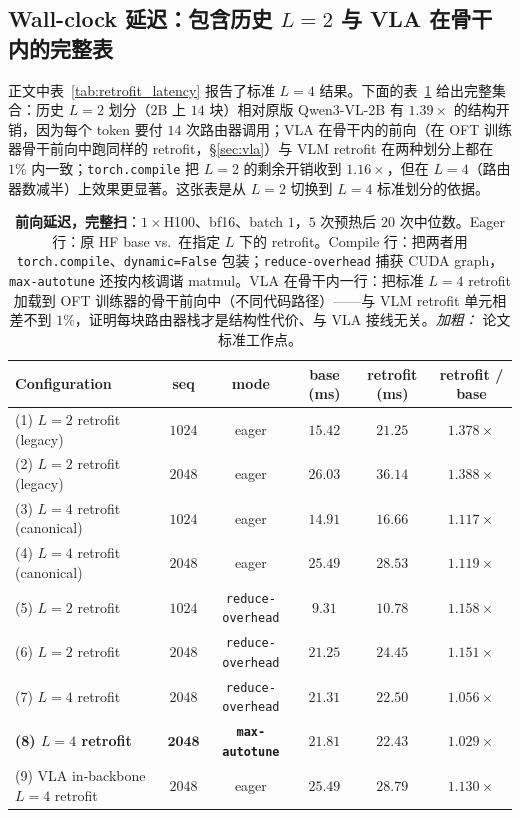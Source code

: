 \documentclass{article}
\begin{document}
\subsection{\texorpdfstring{Wall-clock 延迟：包含历史 $L{=}2$ 与 VLA 在骨干内的完整表}{Wall-clock latency: full table including legacy L=2 and VLA in-backbone}}
\label{app:latency}
正文中表~\ref{tab:retrofit_latency} 报告了标准 $L{=}4$ 结果。下面的表~\ref{tab:retrofit_latency_full} 给出完整集合：历史 $L{=}2$ 划分（$2$B 上 $14$ 块）相对原版 Qwen3-VL-2B 有 $1.39\times$ 的结构开销，因为每个 token 要付 $14$ 次路由器调用；VLA 在骨干内的前向（在 OFT 训练器骨干前向中跑同样的 retrofit，\S\ref{sec:vla}）与 VLM retrofit 在两种划分上都在 $1\%$ 内一致；\texttt{torch.compile} 把 $L{=}2$ 的剩余开销收到 $1.16\times$，但在 $L{=}4$（路由器数减半）上效果更显著。这张表是从 $L{=}2$ 切换到 $L{=}4$ 标准划分的依据。

\begin{table}[h]
\caption{\textbf{前向延迟，完整扫}：$1{\times}$H100、bf16、batch $1$，$5$ 次预热后 $20$ 次中位数。Eager 行：原 HF base vs.\ 在指定 $L$ 下的 retrofit。Compile 行：把两者用 \texttt{torch.compile}、\texttt{dynamic=False} 包装；\texttt{reduce-overhead} 捕获 CUDA graph，\texttt{max-autotune} 还按内核调谐 matmul。VLA 在骨干内一行：把标准 $L{=}4$ retrofit 加载到 OFT 训练器的骨干前向中（不同代码路径）——与 VLM retrofit 单元相差不到 $1\%$，证明每块路由器栈才是结构性代价、与 VLA 接线无关。\emph{加粗：} 论文标准工作点。}
\label{tab:retrofit_latency_full}
\centering\small
\setlength{\tabcolsep}{4pt}
\begin{tabular}{lccccc}
\toprule
Configuration & seq & mode & base (ms) & retrofit (ms) & retrofit / base \\
\midrule
(1) $L{=}2$ retrofit (legacy)        & $1024$ & eager & $15.42$ & $21.25$ & $1.378\times$ \\
(2) $L{=}2$ retrofit (legacy)        & $2048$ & eager & $26.03$ & $36.14$ & $1.388\times$ \\
(3) $L{=}4$ retrofit (canonical)     & $1024$ & eager & $14.91$ & $16.66$ & $1.117\times$ \\
(4) $L{=}4$ retrofit (canonical)     & $2048$ & eager & $25.49$ & $28.53$ & $1.119\times$ \\
\midrule
(5) $L{=}2$ retrofit                 & $1024$ & \texttt{reduce-overhead}  & $9.31$  & $10.78$ & $1.158\times$ \\
(6) $L{=}2$ retrofit                 & $2048$ & \texttt{reduce-overhead}  & $21.25$ & $24.45$ & $1.151\times$ \\
(7) $L{=}4$ retrofit                 & $2048$ & \texttt{reduce-overhead}  & $21.31$ & $22.50$ & $1.056\times$ \\
\textbf{(8) $L{=}4$ retrofit}        & $\mathbf{2048}$ & \textbf{\texttt{max-autotune}} & $\mathbf{21.81}$ & $\mathbf{22.43}$ & $\mathbf{1.029\times}$ \\
\midrule
(9) VLA in-backbone $L{=}4$ retrofit & $2048$ & eager & $25.49$ & $28.79$ & $1.130\times$ \\
\bottomrule
\end{tabular}
\end{table}
\end{document}
